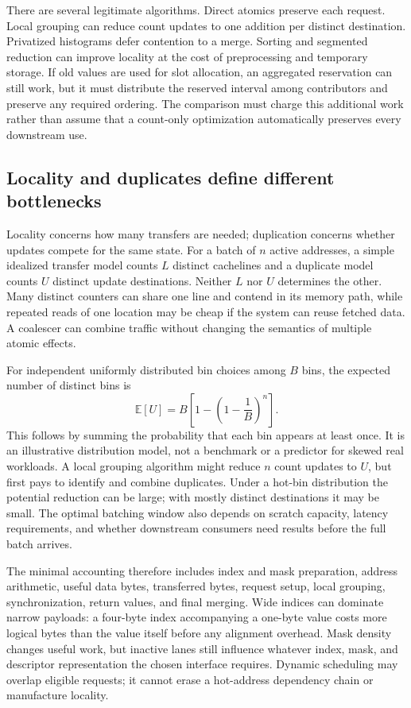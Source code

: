 There are several legitimate algorithms. Direct atomics preserve each request. Local grouping can reduce count updates to one addition per distinct destination. Privatized histograms defer contention to a merge. Sorting and segmented reduction can improve locality at the cost of preprocessing and temporary storage. If old values are used for slot allocation, an aggregated reservation can still work, but it must distribute the reserved interval among contributors and preserve any required ordering. The comparison must charge this additional work rather than assume that a count-only optimization automatically preserves every downstream use.

\subsection{Locality and duplicates define different bottlenecks}

Locality concerns how many transfers are needed; duplication concerns whether updates compete for the same state. For a batch of $n$ active addresses, a simple idealized transfer model counts $L$ distinct cachelines and a duplicate model counts $U$ distinct update destinations. Neither $L$ nor $U$ determines the other. Many distinct counters can share one line and contend in its memory path, while repeated reads of one location may be cheap if the system can reuse fetched data. A coalescer can combine traffic without changing the semantics of multiple atomic effects.

For independent uniformly distributed bin choices among $B$ bins, the expected number of distinct bins is
\begin{equation}
 \mathbb{E}[U]=B\left[1-\left(1-\frac{1}{B}\right)^n\right].
 \label{eq:u004_unique_bins}
\end{equation}
This follows by summing the probability that each bin appears at least once. It is an illustrative distribution model, not a benchmark or a predictor for skewed real workloads. A local grouping algorithm might reduce $n$ count updates to $U$, but first pays to identify and combine duplicates. Under a hot-bin distribution the potential reduction can be large; with mostly distinct destinations it may be small. The optimal batching window also depends on scratch capacity, latency requirements, and whether downstream consumers need results before the full batch arrives.

The minimal accounting therefore includes index and mask preparation, address arithmetic, useful data bytes, transferred bytes, request setup, local grouping, synchronization, return values, and final merging. Wide indices can dominate narrow payloads: a four-byte index accompanying a one-byte value costs more logical bytes than the value itself before any alignment overhead. Mask density changes useful work, but inactive lanes still influence whatever index, mask, and descriptor representation the chosen interface requires. Dynamic scheduling may overlap eligible requests; it cannot erase a hot-address dependency chain or manufacture locality.

